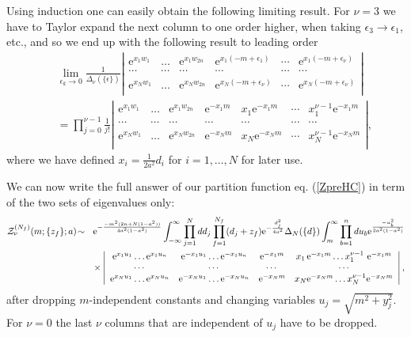 \documentclass[11pt]{article}
\newcommand{\bea}{\begin{eqnarray}}
\newcommand{\eea}{\end{eqnarray}}
\newcommand{\nn}{\nonumber}
\newcommand{\e}{\mbox{e}}
\newcommand{\eps}{\epsilon}
\begin{document}
Using induction one can easily obtain the following limiting result.
For $\nu=3$ we have to Taylor expand
the next column to
one order higher, when taking $\eps_3\to\eps_1$, etc.,
and so we end up with the following result to leading order
\bea
&&\lim_{\eps_k\to0}\frac{1}{\Delta_\nu(\{\eps\})}
\left|
\begin{array}{cccccc}
\e^{x_1w_1}     &\ldots&\e^{x_1w_{2n}}
                &\e^{x_1(-m+\eps_1)}&\cdots&\e^{x_1(-m+\eps_\nu)}\\
\cdots          &\cdots&             \cdots& \cdots&\cdots&\cdots\\
\e^{x_Nw_1}&\ldots&\e^{x_Nw_{2n}}&\e^{x_N(-m+\eps_\nu)}&\cdots&
\e^{x_N(-m+\eps_\nu)}\\
\end{array}
\right|\\
&&=\prod_{j=0}^{\nu-1}\frac{1}{j!}
\left|
\begin{array}{ccccccc}
\e^{x_1w_1}     &\ldots&\e^{x_1w_{2n}}&\e^{-x_1m}&x_1\e^{-x_1m}&\cdots
&x_1^{\nu-1}\e^{-x_1m}\\
\cdots          &\cdots&  \cdots          &\cdots &\cdots&\cdots& \cdots\\
\e^{x_{N}w_1}&\ldots&\e^{x_Nw_{2n}}&\e^{-x_{N}m}&x_{N}\e^{-x_{N}m}
&\cdots&x_{N}^{\nu-1}\e^{-x_{N}m}\\
\end{array}\right|,\nn
\eea
where we have defined $x_{i}=\frac{1}{2a^2}d_i$ for $i=1,\ldots,N$
for later use.

We can now write the full answer of our partition function eq. (\ref{ZpreHC})
in term of the two sets of eigenvalues only:
\bea
{\cal Z}_{\nu}^{(N_f)}(m;\{z_f\};a)\!&\sim&
\!\e^{-\frac{-m^2(2n+N(1-a^2))}{4a^2(1-a^2)}}
\int_{-\infty}^\infty\prod_{j=1}^{N}
dd_j\prod_{f=1}^{N_f}(d_j+z_f) \e^{-\frac{d_j^2}{4a^2}}
\Delta_{N}(\{d\})
\int_m^\infty\prod_{b=1}^{n} du_b
\e^{\frac{-u_b^2}{2a^2(1-a^2)}}
\nn\\
&&\times
\left|
\begin{array}{cccc}
\e^{x_1u_1}\ldots\e^{x_1u_n}&\e^{-x_1u_1}\ldots\e^{-x_1u_n}&\e^{-x_1m}&x_1\,
\e^{-x_1m}\ldots 
x_1^{\nu-1}\ \e^{-x_1m}\\
\cdots &\cdots&\cdots& \cdots\\
\e^{x_{N}u_1}\ldots\e^{x_Nu_n}&\e^{-x_{N}u_1}\ldots\e^{-x_Nu_n}&
\e^{-x_{N}m}&x_{N}\e^{-x_{N}m} 
\ldots x_{N}^{\nu-1}\e^{-x_{N}m}\\
\end{array}\right|,\nn\\
\label{Zev}
\eea
after dropping $m$-independent constants and changing variables
$u_j=\sqrt{m^2+y_j^2}$. For $\nu=0$ the last $\nu$ columns that are
independent of $u_j$ have to be dropped.
\end{document}
